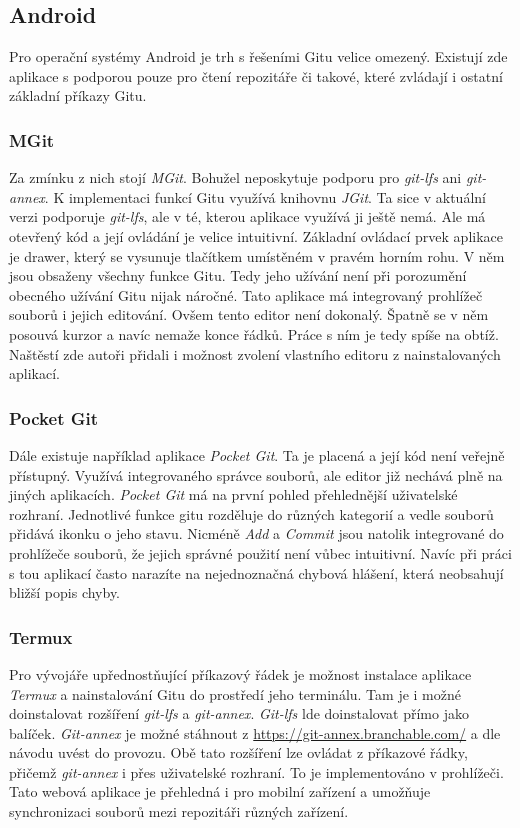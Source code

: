     \subsection {Android}
    Pro operační systémy Android je trh s řešeními Gitu velice omezený. Existují zde aplikace s podporou pouze pro čtení repozitáře či takové, které zvládají i ostatní základní příkazy Gitu.
    \subsubsection{MGit}
    Za zmínku z nich stojí \emph{MGit}. Bohužel neposkytuje podporu pro \emph{git-lfs} ani \emph{git-annex}. K implementaci funkcí Gitu využívá knihovnu \emph{JGit}. Ta sice v aktuální verzi podporuje \emph{git-lfs}, ale v té, kterou aplikace využívá ji ještě nemá. Ale 
    má otevřený kód a její ovládání je velice intuitivní.
    Základní ovládací prvek aplikace je drawer, který se vysunuje tlačítkem umístěném v pravém horním rohu. V něm jsou obsaženy všechny funkce Gitu. Tedy jeho užívání není při porozumění obecného užívání Gitu nijak náročné. Tato aplikace má integrovaný prohlížeč souborů i jejich editování. Ovšem tento editor není dokonalý. Špatně se v něm posouvá kurzor a navíc nemaže konce řádků. Práce s ním je tedy spíše na obtíž. Naštěstí zde autoři přidali i možnost zvolení vlastního editoru z nainstalovaných aplikací.

    \subsubsection{Pocket Git}
    Dále existuje například aplikace \emph{Pocket Git}. Ta je placená a její kód není veřejně přístupný. Využívá integrovaného správce souborů, ale editor již nechává plně na jiných aplikacích. \emph{Pocket Git} má na první pohled přehlednější uživatelské rozhraní. Jednotlivé funkce gitu rozděluje do různých kategorií a vedle souborů přidává ikonku o jeho stavu. Nicméně \emph{Add} a \emph{Commit} jsou natolik integrované do prohlížeče souborů, že jejich správné použití není vůbec intuitivní. Navíc při práci s tou aplikací často narazíte na nejednoznačná chybová hlášení, která neobsahují bližší popis chyby.

    \subsubsection{Termux}
    Pro vývojáře upřednostňující příkazový řádek je možnost instalace aplikace \emph{Termux} a nainstalování Gitu do prostředí jeho terminálu. Tam je i možné doinstalovat rozšíření \emph{git-lfs} a \emph{git-annex}. \emph{Git-lfs} lde doinstalovat přímo jako balíček. \emph{Git-annex} je možné stáhnout z \url{https://git-annex.branchable.com/} a dle návodu uvést do provozu. Obě tato rozšíření lze ovládat z příkazové řádky, přičemž \emph{git-annex} i přes uživatelské rozhraní. To je implementováno v prohlížeči. Tato webová aplikace je přehledná i pro mobilní zařízení a umožňuje synchronizaci souborů mezi repozitáři různých zařízení.

